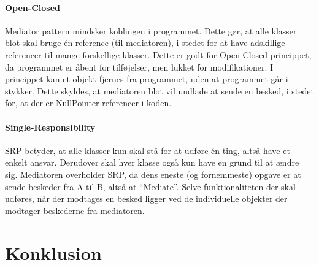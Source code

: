\paragraph{Open-Closed}
Mediator pattern mindsker koblingen i programmet. Dette gør, at alle klasser blot skal bruge én reference (til mediatoren), i stedet for at have adskillige referencer til mange forskellige klasser. Dette er godt for Open-Closed princippet, da programmet er åbent for tilføjelser, men lukket for modifikationer. I princippet kan et objekt fjernes fra programmet, uden at programmet går i stykker. Dette skyldes, at mediatoren blot vil undlade at sende en besked, i stedet for, at der er NullPointer referencer i koden.

\paragraph{Single-Responsibility}
SRP betyder, at alle klasser kun skal stå for at udføre én ting, altså have et enkelt ansvar. Derudover skal hver klasse også kun have en grund til at ændre sig. Mediatoren overholder SRP, da dens eneste (og fornemmeste) opgave er at sende beskeder fra A til B, altså at “Mediate”. Selve funktionaliteten der skal udføres, når der modtages en besked ligger ved de individuelle objekter der modtager beskederne fra mediatoren.

\section{Konklusion}
